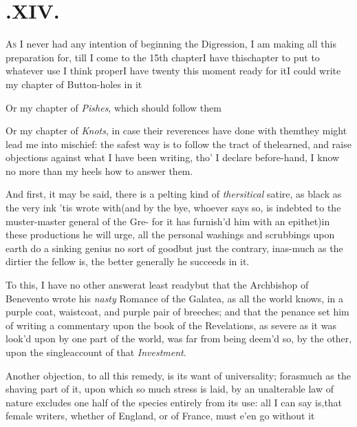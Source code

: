 \documentclass{article}
\begin{document}
\newpage
\section{.\enspace XIV.}

\lettrine{A}{s} I never had any intention of
beginning the Digression, I am making all this preparation for,
till I come to the 15th chapter\tsh I have this\break chapter to
put to whatever use I think proper\tsh I have twenty this
moment ready for it\tsh I could write my chapter of
Button-holes in it\tsh

Or my chapter of \textit{Pishes}, which should follow
them\tsh

Or my chapter of \textit{Knots}, in case their reverences have
done with them\tsh\break they might lead me into mischief: the
safest way is to follow the tract of the\pb learned, and raise
objections against what I have been writing, tho’ I declare
before-hand, I know no more than my heels how to answer them.

And first, it may be said, there is a pelting kind of
\textit{thersitical} satire, as black as the very ink ’tis
wrote with\tsh (and by the bye, whoever says so, is
indebted to the muster-master general of the Gre-
for it has
furnish’d him with an epithet)\break\tsh in these
productions he will urge, all the personal washings and scrubbings
upon earth do a sinking genius no sort of good\tsh but
just the contrary, inas-\pb much as the dirtier the fellow is, the
better generally he succeeds in it.

To this, I have no other answer\tsh\break at least
ready\tsh but that the Archbishop of Benevento
wrote his \textit{nasty} Romance of the Galatea, as all the
world knows, in a purple coat, waistcoat, and purple pair of
breeches; and that the penance set him of writing a commentary upon
the book of the Revelations, as severe as it was
look’d upon by one part of the world, was far from being
deem’d so, by the other, upon the single\break account of that
\textit{Investment}.

Another objection, to all this remedy, is its want of
universality; forasmuch as the shaving part of it, upon which so\pb
much stress is laid, by an unalterable law of nature excludes one
half of the species entirely from its use: all I can say is,\break that
female writers, whether of England, or of France,
must e’en go without it\tsh
\end{document}
